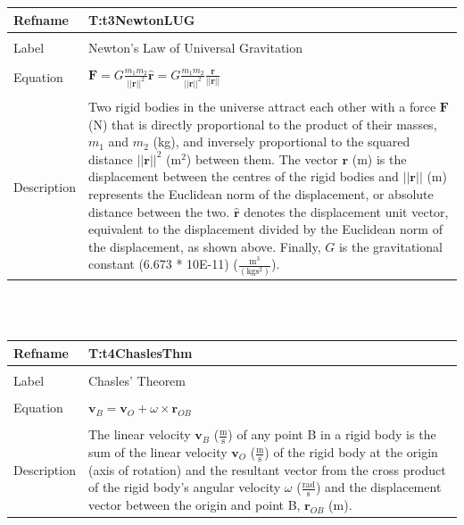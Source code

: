 \documentclass[12pt]{article}
\begin{document}
\noindent \begin{minipage}{\textwidth}
\begin{tabular}{p{} p{}}
\toprule \textbf{Refname} & \textbf{T:t3NewtonLUG}
\label{T:t3NewtonLUG}
\\ \midrule \\
Label & Newton's Law of Universal Gravitation
\\ \midrule \\
Equation & $\mathbf{F}=G \frac{{m_{1}} {m_{2}}}{||\mathbf{r}||^{2}} \mathbf{\hat{r}}=G \frac{{m_{1}} {m_{2}}}{||\mathbf{r}||^{2}} \frac{\mathbf{r}}{||\mathbf{r}||}$
\\ \midrule \\
Description & Two rigid bodies in the universe attract each other with a force $\mathbf{F}$ (N) that is directly proportional to the product of their masses, ${m_{1}}$ and ${m_{2}}$ (kg), and inversely proportional to the squared distance ${||\mathbf{r}||^{2}}$ ($\text{m}^{2}$) between them. The vector $\mathbf{r}$ (m) is the displacement between the centres of the rigid bodies and $||\mathbf{r}||$ (m) represents the Euclidean norm of the displacement, or absolute distance between the two. $\mathbf{\hat{r}}$ denotes the displacement unit vector, equivalent to the displacement divided by the Euclidean norm of the displacement, as shown above. Finally, $G$ is the gravitational constant (6.673 * 10E-11) ($\frac{\text{m}^{3}}{(\text{kg}\text{s}^{2})}$).
\\ \bottomrule \end{tabular}
\end{minipage}\\
~\newline
\noindent \begin{minipage}{\textwidth}
\begin{tabular}{p{} p{}}
\toprule \textbf{Refname} & \textbf{T:t4ChaslesThm}
\label{T:t4ChaslesThm}
\\ \midrule \\
Label & Chasles' Theorem
\\ \midrule \\
Equation & ${\mathbf{v}_{B}}={\mathbf{v}_{O}}+ω\times{\mathbf{r}_{OB}}$
\\ \midrule \\
Description & The linear velocity ${\mathbf{v}_{B}}$ ($\frac{\text{m}}{\text{s}}$) of any point B in a rigid body is the sum of the linear velocity ${\mathbf{v}_{O}}$ ($\frac{\text{m}}{\text{s}}$) of the rigid body at the origin (axis of rotation) and the resultant vector from the cross product of the rigid body's angular velocity $ω$ ($\frac{\text{rad}}{\text{s}}$) and the displacement vector between the origin and point B, ${\mathbf{r}_{OB}}$ (m).
\\ \bottomrule \end{tabular}
\end{minipage}\\
\end{document}
